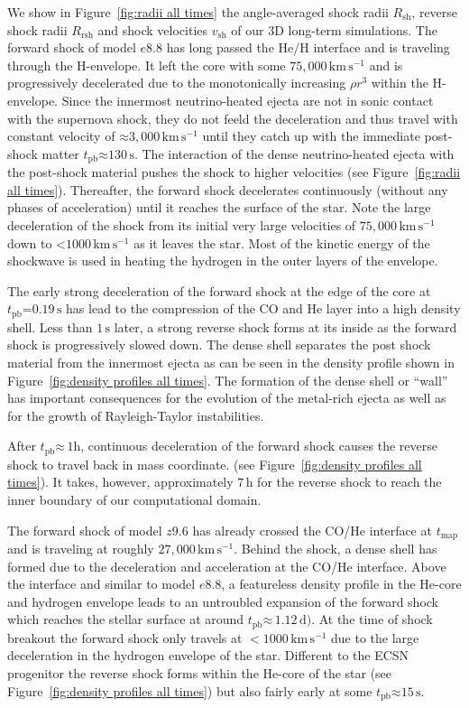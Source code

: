 \documentclass[fleqn,usenatbib]{mnras}
\newcommand{\tpb}{\ensuremath{t_{\text{pb}}}}
\newcommand{\kms}{\ensuremath{\mathrm{km\, s^{-1}}}}
\newcommand{\s}{\ensuremath{\text{s}}}
\begin{document}
We show in Figure~\ref{fig:radii all times} the angle-averaged shock radii $R_{\mathrm{sh}}$, reverse shock radii $R_{\mathrm{rsh}}$ and shock velocities $v_{\mathrm{sh}}$ of our 3D long-term simulations.
The forward shock of model $e8.8$ has long passed the He/H interface and is traveling through the H-envelope.
It left the core with some $75,000\,\kms$ and is progressively decelerated 
due to the monotonically increasing $\rho r^3$ within the H-envelope. 
Since the innermost neutrino-heated ejecta are not in sonic contact with the 
supernova shock, they do not feeld the deceleration and thus travel with constant velocity of $\mathord{\approx}3,000\,\kms$ until they catch up with the immediate post-shock matter $\tpb\mathord{\approx}130\,\s$.
The interaction of the dense neutrino-heated ejecta with the post-shock material pushes the shock to higher velocities (see Figure~\ref{fig:radii all times}).
Thereafter, the forward shock decelerates continuously (without any phases
of acceleration) until it reaches the surface of the star. Note the large deceleration of the shock from its 
initial very large velocities of $75,000\,\kms$
down to $\mathord{<}1000\,\kms$ as it leaves the star. Most of the kinetic energy of the shockwave is used in
heating the hydrogen in the outer layers of the envelope.

The early strong deceleration of the forward shock at the edge of the core at $\tpb\mathord{=}0.19\,\text{s}$ has
lead to the compression of the CO and He layer into a high density shell. Less than $1\,\s$ later, a strong
reverse shock forms at its inside as the forward shock is progressively slowed down.
The dense shell separates the post shock material from the innermost ejecta as can be seen
in the density profile shown in Figure~\ref{fig:density profiles all times}. The formation of the dense shell or ``wall'' 
\cite{Kifonidis2006} has important consequences for the evolution of the metal-rich ejecta as well as for the growth
of Rayleigh-Taylor instabilities.

After $\tpb\mathord{\approx}\,1\text{h}$, continuous deceleration of the forward
shock causes the reverse shock to travel back in mass coordinate.
(see Figure~\ref{fig:density profiles all times}). It takes, however, approximately
$7\,\text{h}$ for the reverse shock to reach the inner boundary of our computational domain. 

The forward shock of model $z9.6$ has already crossed the CO/He interface at $t_{\mathrm{map}}$
and is traveling at roughly $27,000\,\kms$. 
Behind the shock, a dense shell has formed due to the deceleration
and acceleration at the CO/He interface.
Above the interface and similar to model $e8.8$, 
a featureless density profile in the He-core and hydrogen envelope leads to an 
untroubled expansion of the forward shock which reaches 
the stellar surface at around $\tpb\mathord{\approx}\,1.12\,\mathrm{d})$. 
At the time of shock breakout the forward shock only travels at $<1000\,\kms$ due to
the large deceleration in the hydrogen envelope of the star. 
Different to the ECSN progenitor the reverse shock forms within the He-core of the star
(see Figure~\ref{fig:density profiles all times}) but also fairly early at some $\tpb \mathord{\approx} 15\,\s$.
\end{document}
